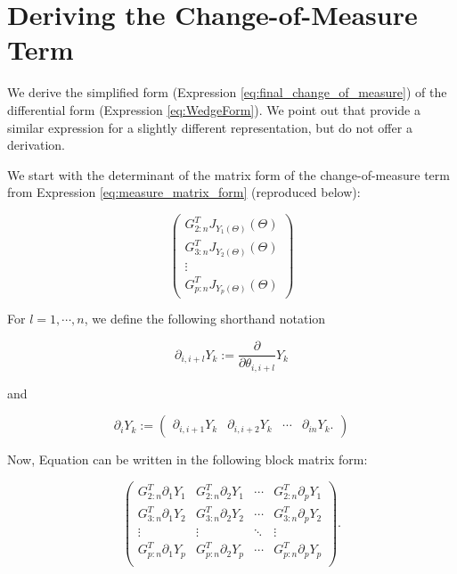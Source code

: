 \documentclass[ba]{imsart}
\numberwithin{equation}{section}
\theoremstyle{plain}
\begin{document}
\appendix
\section{Deriving the Change-of-Measure Term}
We derive the simplified form (Expression \ref{eq:final_change_of_measure}) of the differential form (Expression \ref{eq:WedgeForm}). We point out that \cite{khatri1977mises} provide a similar expression for a slightly different representation, but do not offer a derivation.

\noindent We start with the determinant of the matrix form of the change-of-measure term from Expression \ref{eq:measure_matrix_form} (reproduced below):

\begin{equation}
\begin{pmatrix}
G_{2:n}^T J_{Y_1(\Theta)}(\Theta)\\
G_{3:n}^T J_{Y_2(\Theta)}(\Theta)\\
\vdots\\
G_{p:n}^T J_{Y_p(\Theta)}(\Theta)
\end{pmatrix}
\end{equation}

\noindent For $l = 1, \cdots, n$, we define the following shorthand notation

\begin{equation}
\partial_{i,i+l} Y_k := \frac{\partial}{\partial \theta_{i,i+l}} Y_k
\end{equation}

\noindent and

\begin{equation}
\partial_{i} Y_k
:=
\begin{pmatrix}
\partial_{i,i+1} Y_k & \partial_{i,i+2} Y_k & \cdots & \partial_{in} Y_k.
\end{pmatrix}
\end{equation}

\noindent Now, Equation can be written in the following block matrix form:

\begin{equation}
\label{eq:matrix_blockform}
\begin{pmatrix}
G_{2:n}^T \partial_{1} Y_1 &G_{2:n}^T \partial_{2} Y_1 & \cdots & G_{2:n}^T \partial_{p} Y_1\\
G_{3:n}^T \partial_{1} Y_2 &G_{3:n}^T \partial_{2} Y_2 & \cdots & G_{3:n}^T \partial_{p} Y_2\\
\vdots & \vdots & \ddots & \vdots\\
G_{p:n}^T \partial_{1} Y_p &G_{p:n}^T \partial_{2} Y_p & \cdots & G_{p:n}^T \partial_{p} Y_p\\
\end{pmatrix}.
\end{equation}
\end{document}
